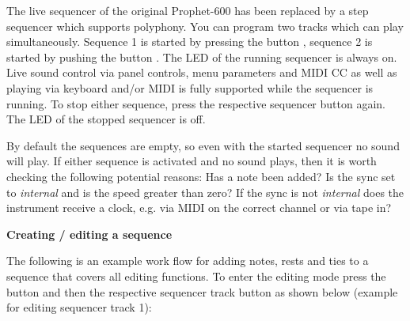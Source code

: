 The live sequencer of the original Prophet-600 has been replaced by a step sequencer which supports polyphony. You can program two tracks which can play simultaneously. Sequence 1 is started by pressing the button \seqone, sequence 2 is started by pushing the button \seqtwo. The LED of the running sequencer is always on. Live sound control via panel controls, menu parameters and MIDI CC as well as playing via keyboard and/or MIDI is fully supported while the sequencer is running. To stop either sequence, press the respective sequencer button again. The LED of the stopped sequencer is off. 

By default the sequences are empty, so even with the started sequencer no sound will play. If either sequence is activated and no sound plays, then it is worth checking the following potential reasons: Has a note been added? Is the sync set to \textit{internal} and is the speed greater than zero? If the sync is not \textit{internal} does the instrument receive a clock, e.g. via MIDI on the correct channel or via tape in?

\textbf{Creating / editing a sequence}

The following is an example work flow for adding notes, rests and ties to a sequence that covers all editing functions. To enter the editing mode press the \record button and then the respective sequencer track button as shown below (example for editing sequencer track 1):

\begin{center}
  
\end{center}

